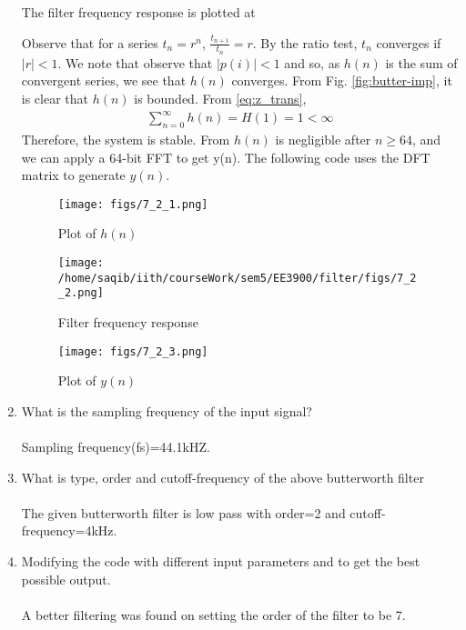 \documentclass[journal,12pt,twocolumn]{IEEEtran}
\renewcommand\thesection{\arabic{section}}
\begin{document}
\begin{enumerate}[label=\thesection.\arabic*]

The filter frequency response is plotted at

Observe that for a series $t_n = r^n$, $\frac{t_{n + 1}}{t_n} = r$.
By the ratio test, $t_n$ converges if $|r| < 1$. We note that
observe that $|p(i)| < 1$ and so, as $h(n)$ is the sum of convergent series,
we see that $h(n)$ converges. From Fig. \eqref{fig:butter-imp}, it is clear
that $h(n)$ is bounded. From \eqref{eq:z_trans},
\begin{align}
	\sum_{n = 0}^{\infty}h(n) = H(1) = 1 < \infty
\end{align}
Therefore, the system is stable. From
$h(n)$ is negligible after $n \geq 64$, and we
can apply a 64-bit FFT to get y(n). The following code uses the DFT matrix
to generate $y(n)$.

\begin{figure}[!htb]
	\texttt{[image: figs/7\_2\_1.png]}
	\caption{Plot of $h(n)$}
	\label{fig:butter-imp}
\end{figure}
\begin{figure}[!htb]
	\texttt{[image: /home/saqib/iith/courseWork/sem5/EE3900/filter/figs/7\_2\_2.png]}
	\caption{Filter frequency response}
	\label{fig:butter-resp}
\end{figure}
\begin{figure}[!htb]
	\texttt{[image: figs/7\_2\_3.png]}
	\caption{Plot of $y(n)$}
	\label{fig:butter-out}
\end{figure}
\item What is the sampling frequency of the input signal?
\\\solution\\
Sampling frequency(fs)=44.1kHZ.
\item
What is type, order and  cutoff-frequency of the above butterworth filter
\\\solution\\
The given butterworth filter is low pass with order=2 and cutoff-frequency=4kHz.
%
\item
Modifying the code with different input parameters and to get the best possible output.
\\\solution\\
A better filtering was found on setting the order of the filter to be 7.
\end{enumerate}
\end{document}
